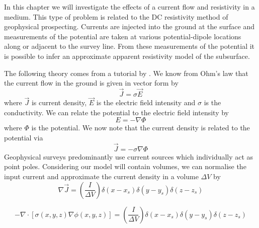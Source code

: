 
%
%
%

In this chapter we will investigate the effects of a current flow and
resistivity in a medium. This type of problem is related to the DC resistivity method of
geophysical prospecting. Currents are injected into the ground at the surface
and measurements of the potential are taken at various potential-dipole
locations along or adjacent to the survey line. From these measurements of the
potential it is possible to infer an approximate apparent resistivity model of
the subsurface.

The following theory comes from a tutorial by \citet{Loke2004}.
We know from Ohm's law that the current flow in the ground is given in vector
form by
\begin{equation}
\vec{J}=\sigma\vec{E}
\end{equation}
where $\vec{J}$ is current density, $\vec{E}$ is the electric field intensity
and $\sigma$ is the conductivity. We can relate the potential to the electric
field intensity by 
\begin{equation}
E=-\nabla\Phi
\end{equation}
where $\Phi$ is the potential. We now note that the current density is related
to the potential via
\begin{equation}
\vec{J}=-\sigma\nabla\Phi
\end{equation}
Geophysical surveys predominantly use current sources which individually act as
point poles. Considering our model will contain volumes, we can normalise the
input current and approximate the current density in a volume $\Delta V$ by
\begin{equation}
\nabla \vec{J} =
\left(\frac{I}{\Delta V} \right) \delta(x-x_{s})
								 \delta(y-y_{s})
								 \delta(z-z_{s})
\end{equation}

\begin{equation}
-\nabla \cdot \left[ \sigma(x,y,z) \nabla \phi (x,y,z) \right] =
\left(\frac{I}{\Delta V} \right) \delta(x-x_{s})
								 \delta(y-y_{s})
								 \delta(z-z_{s})			 
\end{equation}

